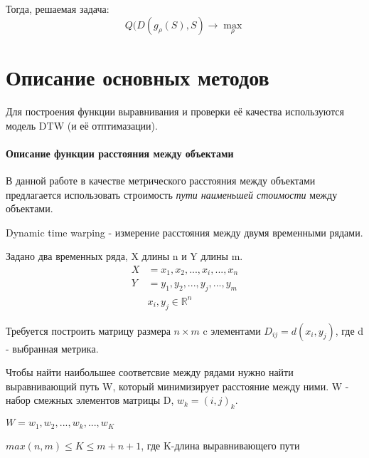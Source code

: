 \documentclass[12pt,twoside]{article}
\begin{document}
        Тогда, решаемая задача:
        $$
            Q(D(g_\rho(S), S) \rightarrow \max_{\rho}
        $$

				
    \section{Описание основных методов}
        
        Для построения функции выравнивания и проверки её качества используются модель DTW (и её отптимазации).
            
        \paragraph{Описание функции расстояния между объектами}

            В данной работе в качестве метрического расстояния между объектами предлагается использовать 
            строимость \textit{пути наименьшей стоимости} между объектами.
            
            Dynamic time warping - измерение расстояния между двумя временными рядами.
            
            Задано два временных ряда, X длины n и Y длины m.
            \begin{align*}
                X &= x_1,x_2, ..., x_i, ..., x_n \\
                Y &= y_1,y_2, ..., y_j, ..., y_m \\
                & x_i, y_j \in \mathbb{R}^n
            \end{align*}

            Требуется построить матрицу размера $n\times m$ c элементами $D_{ij}=d(x_i, y_j)$, где d - выбранная метрика.
            
            Чтобы найти наибольшее соответсвие между рядами нужно найти выравнивающий путь W, который минимизирует расстояние между ними.
            W - набор смежных элементов матрицы D, $w_k = (i, j)_k$.
            
            $W = w_1,w_2, ..., w_k, ..., w_K $

            $max(n, m)\leq K \leq m+n+1$, где K-длина выравнивающего пути
            
\end{document}
